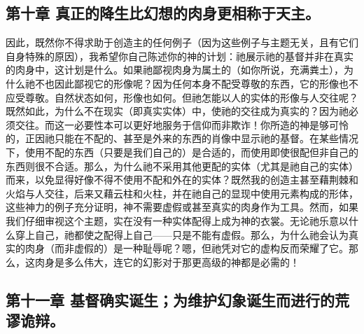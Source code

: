 
\subsection{第十章 真正的降生比幻想的肉身更相称于天主。}

因此，既然你不得求助于创造主的任何例子（因为这些例子与主题无关，且有它们自身特殊的原因），我希望你自己陈述你的神的计划：祂展示祂的基督并非在真实的肉身中，这计划是什么。如果祂鄙视肉身为属土的（如你所说，充满粪土），为什么祂不也因此鄙视它的形像呢？因为任何本身不配受尊敬的东西，它的形像也不应受尊敬。自然状态如何，形像也如何。但祂怎能以人的实体的形像与人交往呢？既然如此，为什么不在现实（即真实实体）中，使祂的交往成为真实的？因为祂必须交往。而这一必要性本可以更好地服务于信仰而非欺诈！你所造的神是够可怜的，正因祂只能在不配的、甚至是外来的东西的肖像中显示祂的基督。在某些情况下，使用不配的东西（只要是我们自己的）是合适的，而使用即使很配但非自己的东西则很不合适。那么，为什么祂不采用其他更配的实体（尤其是祂自己的实体）而来，以免显得好像不得不使用不配和外在的实体？既然我的创造主甚至藉荆棘和火焰与人交往，后来又藉云柱和火柱，并在祂自己的显现中使用元素构成的形体，这些神力的例子充分证明，神不需要虚假或甚至真实的肉身作为工具。然而，如果我们仔细审视这个主题，实在没有一种实体配得上成为神的衣裳。无论祂乐意以什么穿上自己，祂都使之配得上自己——只是不能有虚假。那么，为什么祂会认为真实的肉身（而非虚假的）是一种耻辱呢？嗯，但祂凭对它的虚构反而荣耀了它。那么，这肉身是多么伟大，连它的幻影对于那更高级的神都是必需的！\par


\subsection{第十一章 基督确实诞生；为维护幻象诞生而进行的荒谬诡辩。}

